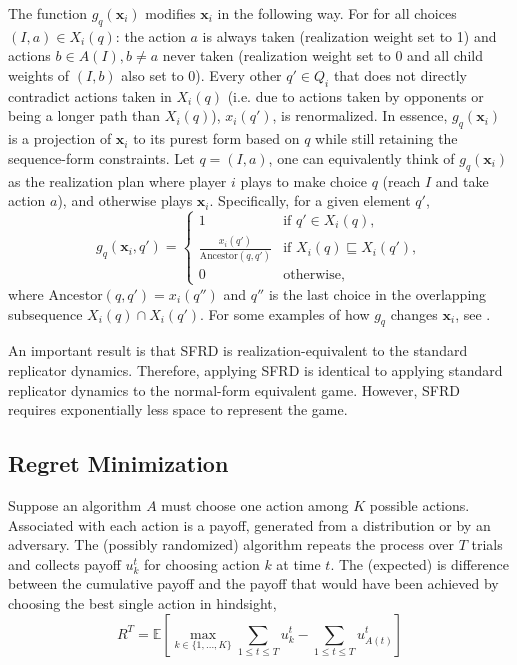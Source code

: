\documentclass{aamas2014}
\newcommand{\bE}{\mathbb{E}}
\newcommand{\bx}{\mathbf{x}}
\newcommand{\defword}[1]{\textbf{\boldmath{#1}}}
\begin{document}
The function $g_q(\bx_i)$ modifies $\bx_i$ in the following way. 
For for all choices $(I,a) \in X_i(q)$: the action $a$ is always taken (realization weight
set to 1) and actions $b \in A(I), b \not= a$ never taken (realization weight set to 0 and all child weights of $(I,b)$ also set to 0). 
Every other $q' \in Q_i$ that does not directly contradict actions taken in $X_i(q)$ 
(i.e. due to actions taken by opponents or being a longer path than $X_i(q)$),
$x_i(q')$, is renormalized. 
In essence, $g_q(\bx_i)$ is a projection of $\bx_i$ to its purest form based on $q$ 
while still retaining the sequence-form constraints. 
Let $q = (I,a)$, one can equivalently think of $g_q(\bx_i)$ as the realization plan where player $i$ plays to make choice $q$ 
(reach $I$ and take action $a$), and otherwise plays $\bx_i$. 
Specifically, for a given element $q'$, 
\begin{equation}
\label{eq:gdef}
g_q(\bx_i, q') = \left\{ \begin{array}{ll}
  1                                                   & \mbox{if $q' \in X_i(q)$}, \\
\frac{x_i(q')}{\mbox{Ancestor}(q, q')}    & \mbox{if $X_i(q) \sqsubseteq X_i(q')$}, \\  
  0                                                   & \mbox{otherwise}, \end{array} \right.
\end{equation}
where Ancestor$(q, q') = x_i(q'')$ and $q''$ is the last choice in the overlapping subsequence  
$X_i(q) \cap X_i(q')$. For some examples of how $g_q$ changes $\bx_i$, see \cite{Gatti13Efficient}. 

An important result is that SFRD is realization-equivalent to the standard replicator dynamics. Therefore, applying SFRD is identical 
to applying standard replicator dynamics to the normal-form equivalent game. However, SFRD requires exponentially less space to represent
the game. 

\subsection{Regret Minimization}
\label{sec:regmin}

Suppose an algorithm $A$ must choose one action among $K$ possible actions. 
Associated with each action is a payoff, generated from a distribution or by an adversary. 
The (possibly randomized) algorithm repeats the process over $T$ trials and collects payoff $u_k^t$ for choosing 
action $k$ at time $t$. 
The (expected) \defword{regret} is difference between the cumulative payoff and the payoff that would 
have been achieved by choosing the best single action in hindsight, 
\begin{equation}
\label{eq:regret}
R^T = \bE \left[ \max_{k \in \{1, \ldots, K\}} \sum_{1 \le t \le T} u_k^t - \sum_{1 \le t \le T} u_{A(t)}^t \right]
\end{equation}
\end{document}
